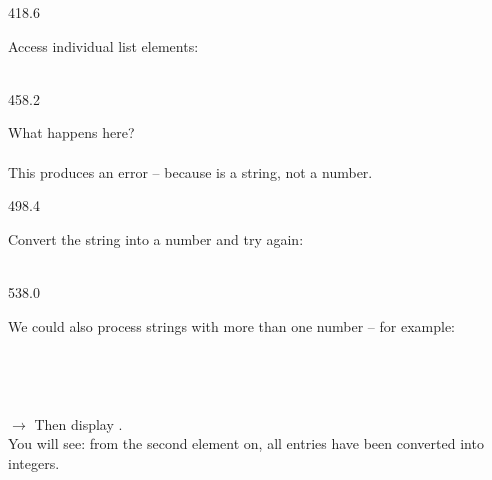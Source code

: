 \documentclass{aslab}
\newcommand*\indentcode[2]{\codearg{\hspace*{#1em}#2}}
\begin{document}
\begin{region}[pitch=13.35]{418.6}
\begin{tasks}[start=4]
\item Access individual list elements:\\
  \tcode{>>> }\\
  \tcode{>>> }
\end{tasks}
\end{region}

\begin{region}[pitch=13.45]{458.2}
\begin{tasks}[start=5]
\item What happens here?\\
  \tcode{>>> }\\
  This produces an error -- because  is a string, not a number.
\end{tasks}
\end{region}

\begin{region}[pitch=13.3]{498.4}
\begin{tasks}[start=6]
\item Convert the string into a number and try again:\\
  \tcode{>>> }\\
  \tcode{>>> }
\end{tasks}
\end{region}

\begin{region}[pitch=13.28]{538.0}
\begin{tasks}[start=7]
\item We could also process strings with more than one number -- for
  example:\\
  \tcode{>>> }\\
  \tcode{>>> }\\
  \tcode{>>> }\\
  \indentcode{2.4}{l[i] = int(l[i])}\\
  $\rightarrow$ Then display .\\
  You will see: from the second element on, all entries have been converted
  into integers.
\end{tasks}
\end{region}
\end{document}
